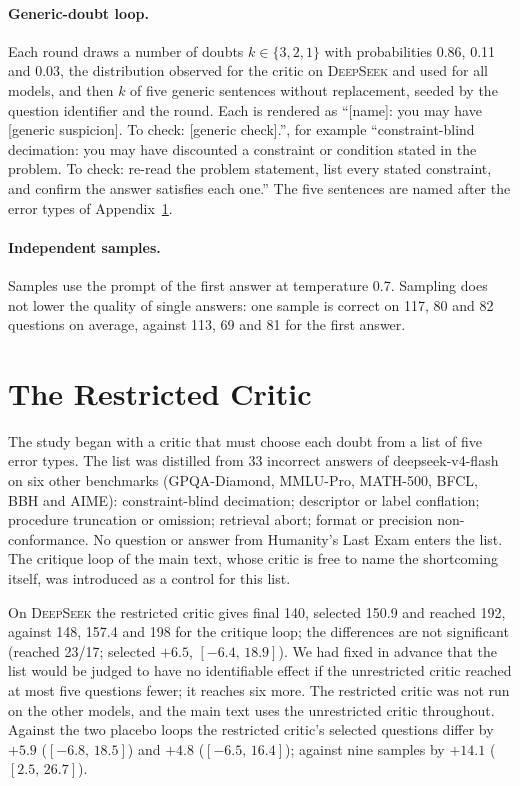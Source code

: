 \documentclass[11pt]{article}
\newcommand{\ds}{\textsc{DeepSeek}}
\newcommand{\ci}[2]{$[#1,\,#2]$}
\begin{document}
\paragraph{Generic-doubt loop.}
Each round draws a number of doubts $k\in\{3,2,1\}$ with probabilities 0.86, 0.11 and 0.03, the distribution observed for the critic on \ds{} and used for all models, and then $k$ of five generic sentences without replacement, seeded by the question identifier and the round.
Each is rendered as ``[name]: you may have [generic suspicion]. To check: [generic check].'', for example ``constraint-blind decimation: you may have discounted a constraint or condition stated in the problem. To check: re-read the problem statement, list every stated constraint, and confirm the answer satisfies each one.''
The five sentences are named after the error types of Appendix~\ref{app:bank}.

\paragraph{Independent samples.}
Samples use the prompt of the first answer at temperature 0.7.
Sampling does not lower the quality of single answers: one sample is correct on 117, 80 and 82 questions on average, against 113, 69 and 81 for the first answer.

\section{The Restricted Critic}
\label{app:bank}

The study began with a critic that must choose each doubt from a list of five error types.
The list was distilled from 33 incorrect answers of deepseek-v4-flash on six other benchmarks (GPQA-Diamond, MMLU-Pro, MATH-500, BFCL, BBH and AIME): constraint-blind decimation; descriptor or label conflation; procedure truncation or omission; retrieval abort; format or precision non-conformance.
No question or answer from Humanity's Last Exam enters the list.
The critique loop of the main text, whose critic is free to name the shortcoming itself, was introduced as a control for this list.

On \ds{} the restricted critic gives final 140, selected 150.9 and reached 192, against 148, 157.4 and 198 for the critique loop; the differences are not significant (reached 23/17; selected $+6.5$, \ci{-6.4}{18.9}).
We had fixed in advance that the list would be judged to have no identifiable effect if the unrestricted critic reached at most five questions fewer; it reaches six more.
The restricted critic was not run on the other models, and the main text uses the unrestricted critic throughout.
Against the two placebo loops the restricted critic's selected questions differ by $+5.9$ (\ci{-6.8}{18.5}) and $+4.8$ (\ci{-6.5}{16.4}); against nine samples by $+14.1$ (\ci{2.5}{26.7}).
\end{document}

